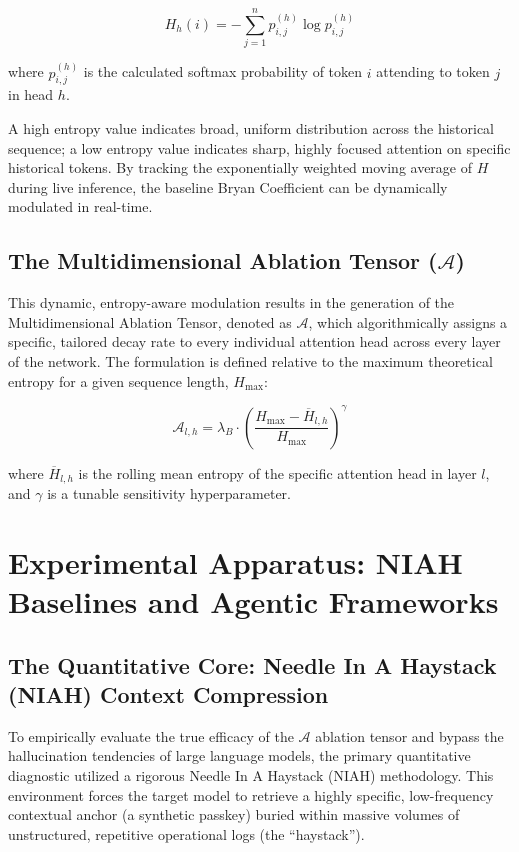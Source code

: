 \documentclass[11pt,a4paper]{article}
\newcommand{\bryanCoeff}{\lambda_B}
\newcommand{\entropy}{H}
\newcommand{\ablTensor}{\mathcal{A}}
\begin{document}
\[
\entropy_h(i) = -\sum_{j=1}^{n} p_{i,j}^{(h)} \log p_{i,j}^{(h)}
\]

where \(p_{i,j}^{(h)}\) is the calculated softmax probability of token \(i\) attending to token \(j\) in head \(h\).

A high entropy value indicates broad, uniform distribution across the historical sequence; a low entropy value indicates sharp, highly focused attention on specific historical tokens. By tracking the exponentially weighted moving average of \(\entropy\) during live inference, the baseline Bryan Coefficient can be dynamically modulated in real-time.

\subsection{The Multidimensional Ablation Tensor (\(\ablTensor\))}
This dynamic, entropy-aware modulation results in the generation of the Multidimensional Ablation Tensor, denoted as \(\ablTensor\), which algorithmically assigns a specific, tailored decay rate to every individual attention head across every layer of the network. The formulation is defined relative to the maximum theoretical entropy for a given sequence length, \(\entropy_{\max}\):

\[
\ablTensor_{l,h} = \bryanCoeff \cdot \left( \frac{\entropy_{\max} - \overline{\entropy}_{l,h}}{\entropy_{\max}} \right)^{\gamma}
\]

where \(\overline{\entropy}_{l,h}\) is the rolling mean entropy of the specific attention head in layer \(l\), and \(\gamma\) is a tunable sensitivity hyperparameter.

\section{Experimental Apparatus: NIAH Baselines and Agentic Frameworks}

\subsection{The Quantitative Core: Needle In A Haystack (NIAH) Context Compression}
To empirically evaluate the true efficacy of the \(\ablTensor\) ablation tensor and bypass the hallucination tendencies of large language models, the primary quantitative diagnostic utilized a rigorous Needle In A Haystack (NIAH) methodology. This environment forces the target model to retrieve a highly specific, low-frequency contextual anchor (a synthetic passkey) buried within massive volumes of unstructured, repetitive operational logs (the ``haystack''). 
\end{document}
